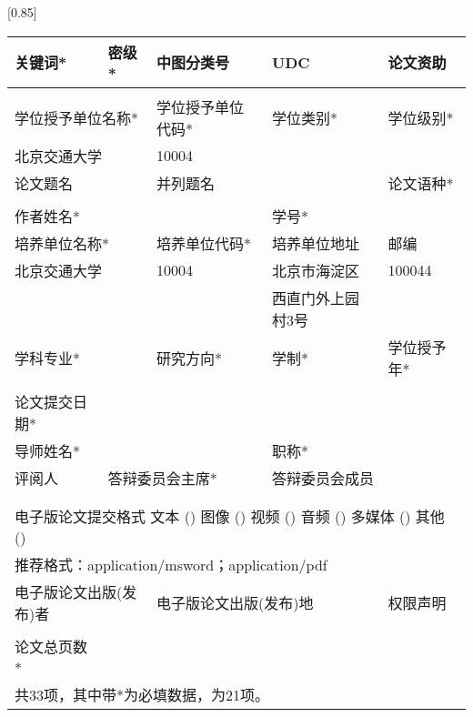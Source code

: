 \begin{metadata}
	\centering
	\begin{table}[htb]
		\scalebox{0.85}[0.85]{ 
		\begin{tabular}{|l|l|l|l|l|}
			\hline
			关键词*\qquad\qquad\qquad & 密级*\qquad\qquad\qquad & 中图分类号\qquad\qquad & UDC\qquad\qquad\qquad\qquad & 论文资助\qquad\qquad \\
			\hline
			& & & & \\
			\hline
			\multicolumn{2}{|l|}{学位授予单位名称*} & 学位授予单位代码* & 学位类别* & 学位级别* \\
			\hline
			\multicolumn{2}{|l|}{北京交通大学} & 10004 &  &  \\
			\hline
			\multicolumn{2}{|l|}{论文题名} & \multicolumn{2}{|l|}{并列题名} &  论文语种* \\
			\hline
			\multicolumn{2}{|l|}{}&\multicolumn{2}{|l|}{}& \\
			\hline
			作者姓名* & \multicolumn{2}{l|}{} & 学号* & \\
			\hline
			\multicolumn{2}{|l|}{培养单位名称*} & 培养单位代码* & 培养单位地址 & 邮编 \\
			\hline
			\multicolumn{2}{|l|}{北京交通大学} & 10004 & 北京市海淀区 & 100044 \\
			\multicolumn{2}{|l|}{}& & 西直门外上园村3号 & \\
			\hline
			\multicolumn{2}{|l|}{学科专业*} & 研究方向* & 学制* & 学位授予年* \\
			\hline
			\multicolumn{2}{|l|}{} & & & \\
			\hline
			论文提交日期* & \multicolumn{4}{|l|}{} \\
			\hline
			导师姓名* & \multicolumn{2}{|l|}{} & 职称* & \\
			\hline
			评阅人 & \multicolumn{2}{|l|}{答辩委员会主席*} & \multicolumn{2}{|l|}{答辩委员会成员} \\
			& \multicolumn{2}{|l|}{} & \multicolumn{2}{|l|}{}  \\
			& \multicolumn{2}{|l|}{} & \multicolumn{2}{|l|}{} \\
			\hline
			\multicolumn{5}{|l|}{电子版论文提交格式  文本 (\quad)  图像 (\quad) 视频 (\quad) 音频 (\quad) 多媒体 (\quad) 其他 (\quad)}\\
			\multicolumn{5}{|l|}{推荐格式：application/msword；application/pdf} \\
			\hline
			\multicolumn{2}{|l|}{电子版论文出版(发布)者} & \multicolumn{2}{|l|}{电子版论文出版(发布)地} & 权限声明 \\
			\hline
			\multicolumn{2}{|l|}{} & \multicolumn{2}{|l|}{} & \\
			\hline
			论文总页数* & \multicolumn{4}{|l|}{} \\
			\hline
			\multicolumn{5}{|l|}{共33项，其中带*为必填数据，为21项。}\\
			\hline
		\end{tabular}
		}
	\end{table}
\end{metadata}